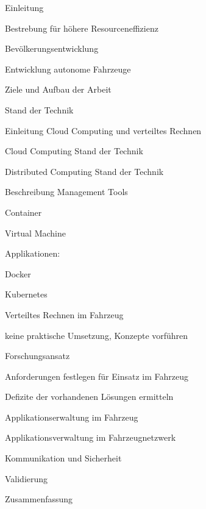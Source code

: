 \begin{notes}
    \item Einleitung
    \begin{notes}
        \item Bestrebung für höhere Resourceneffizienz
        \item Bevölkerungsentwicklung
        \item Entwicklung autonome Fahrzeuge
        \item Ziele und Aufbau der Arbeit
    \end{notes}    
    \item Stand der Technik
    \begin{notes}
        \item Einleitung Cloud Computing und verteiltes Rechnen
        \item Cloud Computing Stand der Technik
        \item Distributed Computing Stand der Technik
        \item Beschreibung Management Tools 
        \item Container
        \item Virtual Machine
        \item Applikationen:
        \item Docker
        \item Kubernetes
        \item Verteiltes Rechnen im Fahrzeug
        \item keine praktische Umsetzung, Konzepte vorführen
    \end{notes}
    \item Forschungsansatz
    \begin{notes}
        \item Anforderungen festlegen für Einsatz im Fahrzeug
        \item Defizite der vorhandenen Lösungen ermitteln
        \item 
    \end{notes}
    \item Applikationserwaltung im Fahrzeug
    \item Applikationsverwaltung im Fahrzeugnetzwerk
    \item Kommunikation und Sicherheit
    \item Validierung
    \item Zusammenfassung
\end{notes}

